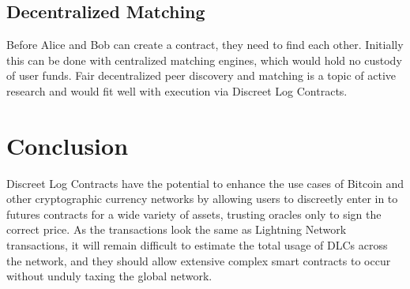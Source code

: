 \documentclass[11pt]{article}
\begin{document}
\subsection*{Decentralized Matching}

Before Alice and Bob can create a contract, they need to find each other.  Initially this can be done with centralized matching engines, which would hold no custody of user funds.  Fair decentralized peer discovery and matching is a topic of active research and would fit well with execution via Discreet Log Contracts.

\section*{Conclusion}

Discreet Log Contracts have the potential to enhance the use cases of Bitcoin and other cryptographic currency networks by allowing users to discreetly enter in to futures contracts for a wide variety of assets, trusting oracles only to sign the correct price.  As the transactions look the same as Lightning Network transactions, it will remain difficult to estimate the total usage of DLCs across the network, and they should allow extensive complex smart contracts to occur without unduly taxing the global network.




\end{document}
